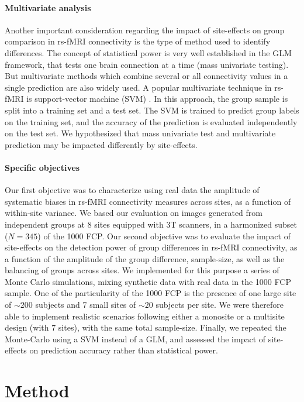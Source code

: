 \documentclass[authoryear]{elsarticle}
\begin{document}
\paragraph{Multivariate analysis}
Another important consideration regarding the impact of site-effects on group comparison in rs-fMRI connectivity is the type of method used to identify differences. The concept of statistical power is very well established in the GLM framework, that tests one brain connection at a time (mass univariate testing). But multivariate methods which combine several or all connectivity values in a single prediction are also widely used. A popular multivariate technique in rs-fMRI is support-vector machine (SVM) \citep{Cortes1995}. In this approach, the group sample is split into a training set and a test set. The SVM is trained to predict group labels on the training set, and the accuracy of the prediction is evaluated independently on the test set. We hypothesized that mass univariate test and multivariate prediction may be impacted differently by site-effects. 

\paragraph{Specific objectives}
Our first objective was to characterize using real data the amplitude of systematic biases in rs-fMRI connectivity measures across sites, as a function of within-site variance. We based our evaluation on images generated from independent groups at 8 sites equipped with 3T scanners, in a harmonized subset ($N=345$) of the 1000 FCP. Our second objective was to evaluate the impact of site-effects on the detection power of group differences in rs-fMRI connectivity, as a function of the amplitude of the group difference, sample-size, as well as the balancing of groups across sites. We implemented for this purpose a series of Monte Carlo simulations, mixing synthetic data with real data in the 1000 FCP sample. One of the particularity of the 1000 FCP is the presence of one large site of $\sim200$ subjects and 7 small sites of $\sim20$ subjects per site. We were therefore able to implement realistic scenarios following either a monosite or a multisite design (with 7 sites), with the same total sample-size. Finally, we repeated the Monte-Carlo using a SVM instead of a GLM, and assessed the impact of site-effects on prediction accuracy rather than statistical power.

\section{Method}
\end{document}

